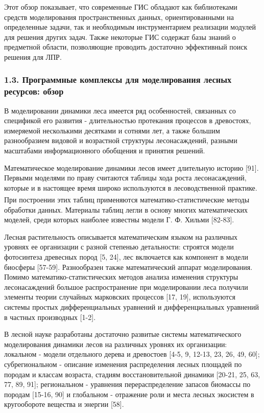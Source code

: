 \documentclass{article}
\begin{document}
Этот обзор показывает, что современные ГИС 
обладают как библиотеками средств моделирования 
пространственных данных, ориентированными 
на определенные задачи, так и необходимым инструментарием 
реализации модулей для решения других задач. 
 Также некоторые ГИС содержат базы знаний о 
предметной области, позволяющие проводить 
достаточно эффективный поиск решения для ЛПР.\label{HToc199746718}

\subsubsection*{\textbf{1.3. Программные комплексы для  
моделирования лесных ресурсов: обзор}}

В моделировании динамики леса имеется ряд особенностей, 
связанных со спецификой его развития - длительностью 
протекания процессов в древостоях, измеряемой 
несколькими десятками и сотнями лет, а также 
большим разнообразием видовой и возрастной 
структуры лесонасаждений, разными масштабами 
информационного обобщения и принятия решений. 

Математическое моделирование динамики лесов 
имеет длительную историю [91]. Первыми моделями 
по праву считаются таблицы хода роста лесонасаждений, 
которые и в настоящее время широко используются 
в лесоводственной практике. При построении\textsuperscript{ 
}этих таблиц применяются математико-статистические 
методы обработки данных. Материалы таблиц легли 
в основу многих математических моделей, среди 
которых наиболее известны модели Г. Ф. Хильми 
[82-83].

Лесная растительность описывается математическим 
языком на различных уровнях ее организации 
с разной степенью детальности: строятся модели 
фотосинтеза древесных пород [5, 24], лес включается 
как компонент в модели биосферы [57-59]. Разнообразен 
также математический аппарат моделирования. 
Помимо математико-статистических методов анализа 
изменения структуры лесонасаждений большое 
распространение при моделировании леса получили 
элементы теории случайных марковских процессов 
[17, 19], используются системы простых дифференциальных 
уравнений и дифференциальных уравнений в частных 
производных [1-2].

В лесной науке разработаны достаточно развитые 
системы математического моделирования динамики 
лесов на различных уровнях их организации: 
локальном - модели отдельного дерева и древостоев 
[4-5, 9, 12-13, 23, 26, 49, 60]; субрегиональном - описание 
изменения распределения лесных площадей по 
породам и классам возраста, стадиям восстановительной 
динамики [20-21, 25, 63, 77, 89, 91]; региональном - уравнения 
перераспределение запасов биомассы по породам 
[15-16, 90] и глобальном - отражение роли и места 
лесных экосистем в кругообороте вещества и 
энергии [58].
\end{document}
